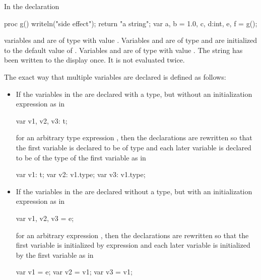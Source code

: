 \begin{example}
In the declaration
\begin{chapel}
proc g() { writeln("side effect"); return "a string"; }
var a, b = 1.0, c, d:int, e, f = g();
\end{chapel}
variables  and  are of type  with
value .  Variables  and  are of
type  and are initialized to the default value of .
Variables  and  are of type  with
value .  The string  has been
written to the display once.  It is not evaluated twice.
\end{example}

The exact way that multiple variables are declared is defined as
follows:
\begin{itemize}
\item If the variables in the  are declared
with a type, but without an initialization expression as in
\begin{chapel}
var v1, v2, v3: t;
\end{chapel}
for an arbitrary type expression , then the declarations are
rewritten so that the first variable is declared to be of
type  and each later variable is declared to be of the type of
the first variable as in
\begin{chapel}
var v1: t; var v2: v1.type; var v3: v1.type;
\end{chapel}

\item If the variables in the  are declared
without a type, but with an initialization expression as in
\begin{chapel}
var v1, v2, v3 = e;
\end{chapel}
for an arbitrary expression , then the declarations are
rewritten so that the first variable is initialized by
expression  and each later variable is initialized by the
first variable as in
\begin{chapel}
var v1 = e; var v2 = v1; var v3 = v1;
\end{chapel}


\end{itemize}
